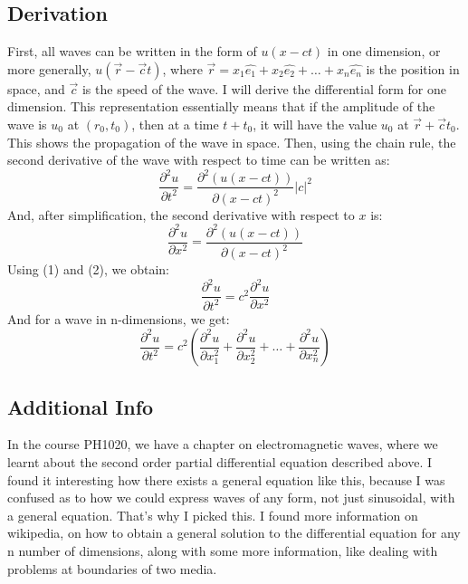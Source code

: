 \documentclass{article}
\begin{document}
\subsection{Derivation}
First, all waves can be written in the form of $u(x-ct)$ in one dimension, or more generally, $u(\vec{r}-\vec{c}t)$, where $\vec{r}= x_1 \hat{e_1} + x_2 \hat{e_2}+\ldots + x_n \hat{e_n}$ is the position in space, and $\vec{c}$ is the speed of the wave. I will derive the differential form for one dimension.
\newline This representation essentially means that if the amplitude of the wave is $u_0$ at $(r_0, t_0)$, then at a time $t+t_0$, it will have the value $u_0$ at $\vec{r}+\vec{c}t_0$. This shows the propagation of the wave in space. 
\newline Then, using the chain rule, the second derivative of the wave with respect to time can be written as:
\begin{equation}
    \frac{\partial ^2 u}{\partial t^2} = \frac{\partial ^2(u(x-ct))}{\partial (x-ct)^2}|c|^2
\end{equation}
\noindent And, after simplification, the second derivative with respect to $x$ is:
\begin{equation}
    \frac{\partial^2 u}{\partial x^2} = \frac{\partial ^2(u(x-ct))}{\partial (x-ct)^2}
\end{equation}
Using (1) and (2), we obtain:
\begin{equation}
    \frac{\partial^{2}{u}}{\partial{t}^2}=c^2\frac{\partial^2 u}{\partial x ^2}
\end{equation}
And for a wave in n-dimensions, we get:
\begin{equation}
    \frac{\partial^{2}{u}}{\partial{t}^2}=c^2(\frac{\partial^2 u}{\partial x_1 ^2}+\frac{\partial^2 u}{\partial x_2 ^2}+\ldots+\frac{\partial^2 u}{\partial x_n ^2})
\end{equation}
\subsection{Additional Info}
In the course PH1020, we have a chapter on electromagnetic waves, where we learnt about the second order partial differential equation described above. I found it interesting how there exists a general equation like this, because I was confused as to how we could express waves of any form, not just sinusoidal, with a general equation. That's why I picked this. I found more information on wikipedia, on how to obtain a general solution to the differential equation for any n number of dimensions, along with some more information, like dealing with problems at boundaries of two media. 



\end{document}
